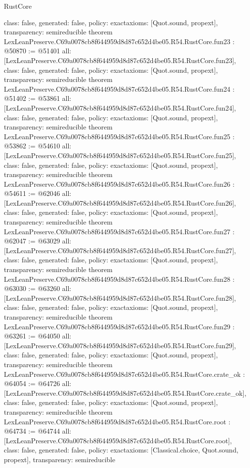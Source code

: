\begin{lexlean}{RustCore}
\begin{coremodule}
{  class: false,
  generated: false,
  policy: exact{axioms: [Quot.sound, propext]},
  transparency: semireducible
}
theorem LexLeanPreserve.C69a0078cb8f644959d8d87c652d4be05.R54.RustCore.fun23 : @50870 := @51401 {
  all: [LexLeanPreserve.C69a0078cb8f644959d8d87c652d4be05.R54.RustCore.fun23],
  class: false,
  generated: false,
  policy: exact{axioms: [Quot.sound, propext]},
  transparency: semireducible
}
theorem LexLeanPreserve.C69a0078cb8f644959d8d87c652d4be05.R54.RustCore.fun24 : @51402 := @53861 {
  all: [LexLeanPreserve.C69a0078cb8f644959d8d87c652d4be05.R54.RustCore.fun24],
  class: false,
  generated: false,
  policy: exact{axioms: [Quot.sound, propext]},
  transparency: semireducible
}
theorem LexLeanPreserve.C69a0078cb8f644959d8d87c652d4be05.R54.RustCore.fun25 : @53862 := @54610 {
  all: [LexLeanPreserve.C69a0078cb8f644959d8d87c652d4be05.R54.RustCore.fun25],
  class: false,
  generated: false,
  policy: exact{axioms: [Quot.sound, propext]},
  transparency: semireducible
}
theorem LexLeanPreserve.C69a0078cb8f644959d8d87c652d4be05.R54.RustCore.fun26 : @54611 := @62046 {
  all: [LexLeanPreserve.C69a0078cb8f644959d8d87c652d4be05.R54.RustCore.fun26],
  class: false,
  generated: false,
  policy: exact{axioms: [Quot.sound, propext]},
  transparency: semireducible
}
theorem LexLeanPreserve.C69a0078cb8f644959d8d87c652d4be05.R54.RustCore.fun27 : @62047 := @63029 {
  all: [LexLeanPreserve.C69a0078cb8f644959d8d87c652d4be05.R54.RustCore.fun27],
  class: false,
  generated: false,
  policy: exact{axioms: [Quot.sound, propext]},
  transparency: semireducible
}
theorem LexLeanPreserve.C69a0078cb8f644959d8d87c652d4be05.R54.RustCore.fun28 : @63030 := @63260 {
  all: [LexLeanPreserve.C69a0078cb8f644959d8d87c652d4be05.R54.RustCore.fun28],
  class: false,
  generated: false,
  policy: exact{axioms: [Quot.sound, propext]},
  transparency: semireducible
}
theorem LexLeanPreserve.C69a0078cb8f644959d8d87c652d4be05.R54.RustCore.fun29 : @63261 := @64050 {
  all: [LexLeanPreserve.C69a0078cb8f644959d8d87c652d4be05.R54.RustCore.fun29],
  class: false,
  generated: false,
  policy: exact{axioms: [Quot.sound, propext]},
  transparency: semireducible
}
theorem LexLeanPreserve.C69a0078cb8f644959d8d87c652d4be05.R54.RustCore.crate_ok : @64054 := @64726 {
  all: [LexLeanPreserve.C69a0078cb8f644959d8d87c652d4be05.R54.RustCore.crate_ok],
  class: false,
  generated: false,
  policy: exact{axioms: [Quot.sound, propext]},
  transparency: semireducible
}
theorem LexLeanPreserve.C69a0078cb8f644959d8d87c652d4be05.R54.RustCore.root : @64734 := @64744 {
  all: [LexLeanPreserve.C69a0078cb8f644959d8d87c652d4be05.R54.RustCore.root],
  class: false,
  generated: false,
  policy: exact{axioms: [Classical.choice, Quot.sound, propext]},
  transparency: semireducible
}


\end{coremodule}
\end{lexlean}
